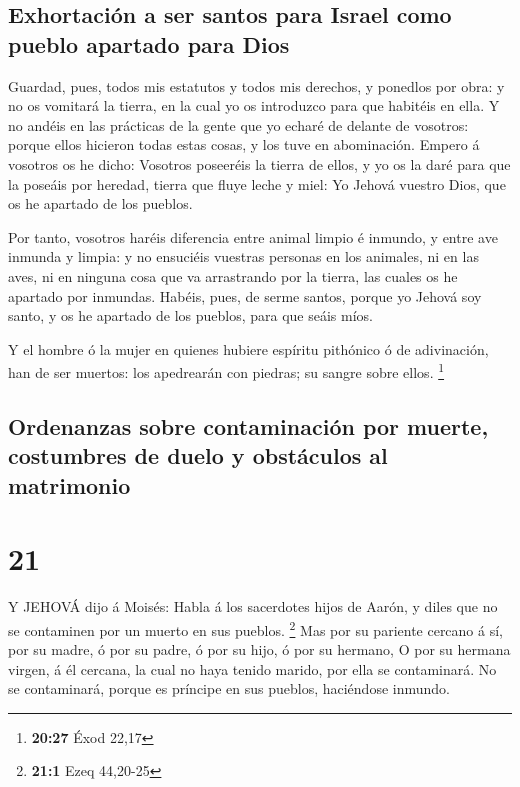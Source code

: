 \hypertarget{exhortaciuxf3n-a-ser-santos-para-israel-como-pueblo-apartado-para-dios}{%
\subsection{Exhortación a ser santos para Israel como pueblo apartado
para
Dios}\label{exhortaciuxf3n-a-ser-santos-para-israel-como-pueblo-apartado-para-dios}}

 Guardad, pues, todos mis estatutos y todos mis derechos, y
ponedlos por obra: y no os vomitará la tierra, en la cual yo os
introduzco para que habitéis en ella.  Y no andéis en las
prácticas de la gente que yo echaré de delante de vosotros: porque ellos
hicieron todas estas cosas, y los tuve en abominación. 
Empero á vosotros os he dicho: Vosotros poseeréis la tierra de ellos, y
yo os la daré para que la poseáis por heredad, tierra que fluye leche y
miel: Yo Jehová vuestro Dios, que os he apartado de los pueblos.

 Por tanto, vosotros haréis diferencia entre animal limpio
é inmundo, y entre ave inmunda y limpia: y no ensuciéis vuestras
personas en los animales, ni en las aves, ni en ninguna cosa que va
arrastrando por la tierra, las cuales os he apartado por inmundas.
 Habéis, pues, de serme santos, porque yo Jehová soy santo,
y os he apartado de los pueblos, para que seáis míos.

 Y el hombre ó la mujer en quienes hubiere espíritu
pithónico ó de adivinación, han de ser muertos: los apedrearán con
piedras; su sangre sobre ellos. \footnote{\textbf{20:27} Éxod 22,17}

\hypertarget{ordenanzas-sobre-contaminaciuxf3n-por-muerte-costumbres-de-duelo-y-obstuxe1culos-al-matrimonio}{%
\subsection{Ordenanzas sobre contaminación por muerte, costumbres de
duelo y obstáculos al
matrimonio}\label{ordenanzas-sobre-contaminaciuxf3n-por-muerte-costumbres-de-duelo-y-obstuxe1culos-al-matrimonio}}

\hypertarget{section-20}{%
\section{21}\label{section-20}}

 Y JEHOVÁ dijo á Moisés: Habla á los sacerdotes hijos de
Aarón, y diles que no se contaminen por un muerto en sus pueblos.
\footnote{\textbf{21:1} Ezeq 44,20-25}  Mas por su pariente
cercano á sí, por su madre, ó por su padre, ó por su hijo, ó por su
hermano,  O por su hermana virgen, á él cercana, la cual no
haya tenido marido, por ella se contaminará.  No se
contaminará, porque es príncipe en sus pueblos, haciéndose inmundo.

